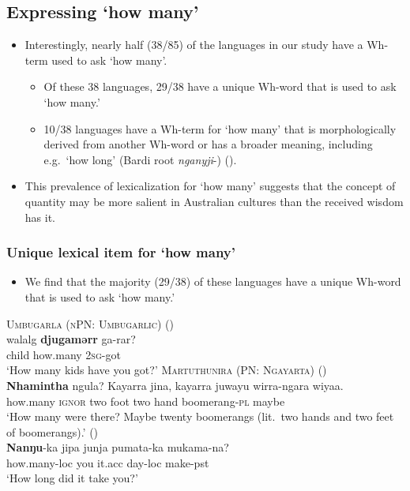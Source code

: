 \documentclass{article}
\makeatletter
\newcommand{\ofy}{/85} %
\makeatother
\begin{document}
\subsection{Expressing `how many'}
\begin{itemize}
\item Interestingly, nearly half (38\ofy{}) of the  languages in our study have a Wh-term used to ask `how many'. 
  \begin{itemize}
  \item Of these 38 languages, 29/38 have a unique Wh-word that is used to ask `how many.'
  \item 10/38 languages have a Wh-term for `how many' that is morphologically derived from another Wh-word or has a broader meaning, including e.g.\ `how long' (Bardi root \textit{nganyji}-) (\citealt{bowern12}).
  \end{itemize}

\item This prevalence of lexicalization for `how many' suggests that the concept of quantity may be more salient in Australian cultures than the received wisdom has it.
\end{itemize}

\subsubsection{Unique lexical item for `how many'}

\begin{itemize}
\item We find that the majority (29/38) of these languages have a unique Wh-word that is used to ask `how many.'
\end{itemize}

\begin{exe}
  \ex \textsc{Umbugarla (nPN: Umbugarlic)} (\citealt[57]{davies89}) \\
  \gll walalg    \textbf{djugamərr}    ga-rar?\\
  child        how.many    2\textsc{sg}-got \\
  \glt `How many kids have you got?'
  \ex \textsc{Martuthunira (PN: Ngayarta)} (\citealt[190]{dench95})\\
  \gll \textbf{Nhamintha} ngula? Kayarra jina, kayarra juwayu wirra-ngara wiyaa.\\
  how.many \textsc{ignor} two foot two hand boomerang-\textsc{pl} maybe\\
  \glt `How many were there? Maybe twenty boomerangs (lit.\ two hands and two feet of boomerangs).'
   (\citealt[260]{breen71})\\
  \gll \textbf{Nanŋu}-ka       jipa  junja    pumata-ka mukama-na?\\
  how.many-{\sc loc} you it.{\sc acc} day{\sc -loc}      make-{\sc pst}\\
  \glt `How long did it take you?' 
\end{exe}
\end{document}
